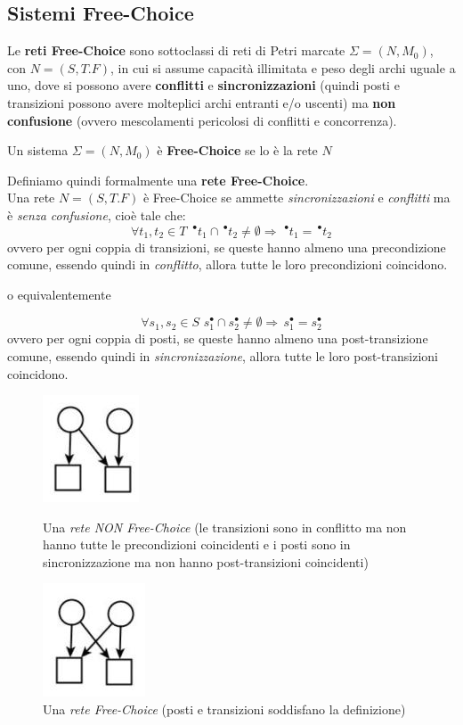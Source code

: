 \documentclass[a4paper,12pt, oneside]{book}
\begin{document}
\subsection{Sistemi Free-Choice}
Le \textbf{reti Free-Choice} sono sottoclassi di reti di Petri marcate $\Sigma=
(N, M_0 )$, con $N = (S, T .F )$, in cui si assume
capacità illimitata e peso degli archi uguale a uno, dove si possono avere
\textbf{conflitti} e \textbf{sincronizzazioni} (quindi posti e transizioni
possono avere molteplici archi entranti e/o uscenti) ma \textbf{non
  confusione} (ovvero mescolamenti pericolosi di conflitti e concorrenza).\\ 
\begin{teorema}
  Un sistema  $\Sigma= (N, M_0 )$ è \textbf{Free-Choice} se lo è la rete $N$
\end{teorema}
\begin{definizione}
  Definiamo quindi formalmente una \textbf{rete Free-Choice}.\\
  Una rete $N = (S, T .F )$ è Free-Choice se ammette \emph{sincronizzazioni} e
  \emph{conflitti} ma è \emph{senza confusione}, cioè tale che:
  \[\forall t_1,t_2\in T\,\,\,^\bullet t_1\cap \,^\bullet t_2\neq
    \emptyset\Rightarrow \,\,^\bullet t_1=\,^\bullet t_2\]
  ovvero per ogni coppia di transizioni, se queste hanno almeno una
  precondizione comune, essendo quindi in \emph{conflitto}, allora tutte le loro
  precondizioni coincidono.
  \begin{center}
    o equivalentemente
  \end{center}
  \[\forall s_1,s_2\in S\,\, s_1^\bullet\cap s_2^\bullet\neq
    \emptyset\Rightarrow \, s_1^\bullet=s_2^\bullet\]
  ovvero per ogni coppia di posti, se queste hanno almeno una post-transizione
  comune, essendo quindi in \emph{sincronizzazione}, allora tutte le loro
  post-transizioni coincidono.
  \begin{figure}[H]
    \centering
    \includegraphics[scale = 0.6]{img/fc1.jpg}
    \caption{Una \emph{rete NON Free-Choice} (le transizioni sono in conflitto
      ma non hanno tutte le precondizioni coincidenti e i posti sono in
      sincronizzazione ma non hanno post-transizioni coincidenti)}
    \includegraphics[scale = 0.6]{img/fc2.jpg}
    \caption{Una \emph{rete Free-Choice} (posti e transizioni soddisfano la
      definizione)} 
  \end{figure}
\end{definizione}
\end{document}
